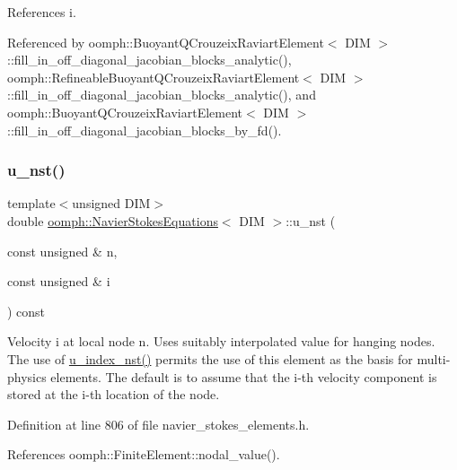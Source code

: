 References i.



Referenced by oomph\+::\+Buoyant\+Q\+Crouzeix\+Raviart\+Element$<$ D\+I\+M $>$\+::fill\+\_\+in\+\_\+off\+\_\+diagonal\+\_\+jacobian\+\_\+blocks\+\_\+analytic(), oomph\+::\+Refineable\+Buoyant\+Q\+Crouzeix\+Raviart\+Element$<$ D\+I\+M $>$\+::fill\+\_\+in\+\_\+off\+\_\+diagonal\+\_\+jacobian\+\_\+blocks\+\_\+analytic(), and oomph\+::\+Buoyant\+Q\+Crouzeix\+Raviart\+Element$<$ D\+I\+M $>$\+::fill\+\_\+in\+\_\+off\+\_\+diagonal\+\_\+jacobian\+\_\+blocks\+\_\+by\+\_\+fd().

\mbox{\label{classoomph_1_1NavierStokesEquations_a67b980c0051620b1fe117d51c4cc6009}} 
\subsubsection{\texorpdfstring{u\+\_\+nst()}{u\_nst()}\hspace{0.1cm}{\footnotesize\ttfamily [1/2]}}
{\footnotesize\ttfamily template$<$unsigned D\+IM$>$ \\
double \hyperlink{classoomph_1_1NavierStokesEquations}{oomph\+::\+Navier\+Stokes\+Equations}$<$ D\+IM $>$\+::u\+\_\+nst (\begin{DoxyParamCaption}\item[{const unsigned \&}]{n,  }\item[{const unsigned \&}]{i }\end{DoxyParamCaption}) const\hspace{0.3cm}{\ttfamily [inline]}}



Velocity i at local node n. Uses suitably interpolated value for hanging nodes. The use of \hyperlink{classoomph_1_1NavierStokesEquations_a136756d3e5f4248b32ce44ecfcb5fb30}{u\+\_\+index\+\_\+nst()} permits the use of this element as the basis for multi-\/physics elements. The default is to assume that the i-\/th velocity component is stored at the i-\/th location of the node. 



Definition at line 806 of file navier\+\_\+stokes\+\_\+elements.\+h.



References oomph\+::\+Finite\+Element\+::nodal\+\_\+value().

